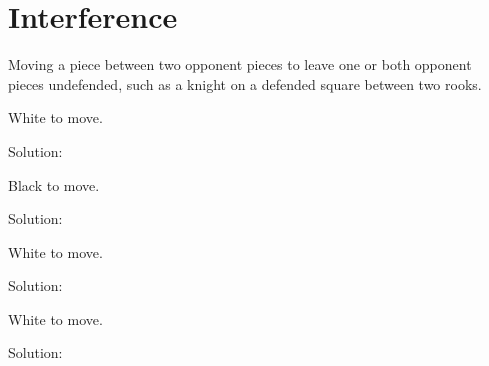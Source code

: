 \documentclass{book}
\begin{document}
\section{Interference}
Moving a piece between two opponent pieces to leave one or both opponent pieces undefended, such as a knight on a defended square between two rooks.\begin{multicols}{2} 
\begin{samepage} 
\newgame 


 
\showboard
 
 White to move. 
 
Solution: 
 
\end{samepage}\begin{samepage} 
\newgame 


 
\showboard
 
 Black to move. 
 
Solution: 
 
\end{samepage}\begin{samepage} 
\newgame 


 
\showboard
 
 White to move. 
 
Solution: 
 
\end{samepage}\begin{samepage} 
\newgame 


 
\showboard
 
 White to move. 
 
Solution: 
 
\end{samepage}\end{multicols} 
\newpage 
\end{document}
